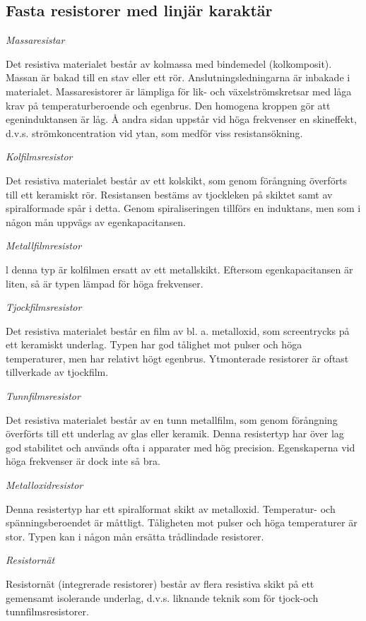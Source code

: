 \subsection{Fasta resistorer med linjär karaktär}

\emph{Massaresistar}

Det resistiva materialet består av kolmassa
med bindemedel (kolkomposit). Massan är
bakad till en stav eller ett rör. Anslutningsledningarna är inbakade i materialet.
Massaresistorer är lämpliga för lik- och
växelströmskretsar med låga krav på temperaturberoende och egenbrus. Den homogena kroppen gör att egeninduktansen är
låg. Å andra sidan uppstår vid höga frekvenser en skineffekt, d.v.s. strömkoncentration
vid ytan, som medför viss resistansökning.

\emph{Kolfilmsresistor}

Det resistiva materialet består av ett kolskikt,
som genom förångning överförts till ett keramiskt rör. Resistansen bestäms av tjockleken på skiktet samt av spiralformade spår i
detta. Genom spiraliseringen tillförs en induktans, men som i någon mån uppvägs av
egenkapacitansen.


\emph{Metallfilmresistor}

l denna typ är kolfilmen ersatt av ett metallskikt. Eftersom egenkapacitansen är liten,
så är typen lämpad för höga frekvenser.

\emph{Tjockfilmsresistor}

Det resistiva materialet består en film av bl. a.
metalloxid, som screentrycks på ett keramiskt underlag. Typen har god tålighet mot
pulser och höga temperaturer, men har relativt högt egenbrus. Ytmonterade resistorer
är oftast tillverkade av tjockfilm.

\emph{Tunnfilmsresistor}

Det resistiva materialet består av en tunn
metallfilm, som genom förångning överförts
till ett underlag av glas eller keramik.
Denna resistertyp har över lag god stabilitet och används ofta i apparater med hög
precision. Egenskaperna vid höga frekvenser är dock inte så bra.

\emph{Metalloxidresistor}

Denna resistertyp har ett spiralformat skikt
av metalloxid. Temperatur- och spänningsberoendet är måttligt. Tåligheten mot pulser
och höga temperaturer är stor. Typen kan i
någon mån ersätta trådlindade resistorer.

\emph{Resistornät}

Resistornät (integrerade resistorer) består
av flera resistiva skikt på ett gemensamt
isolerande underlag, d.v.s. liknande teknik
som för tjock-och tunnfilmsresistorer.

